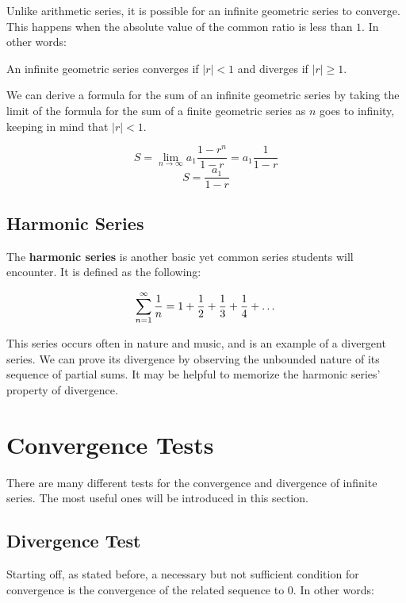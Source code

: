 \documentclass[11pt]{article}
\begin{document}
Unlike arithmetic series, it is possible for an infinite geometric series to converge. This happens when the absolute value of the common ratio is less than $1$. In other words: \\

\begin{center}
An infinite geometric series converges if $|r| < 1$ and diverges if $|r| \geq 1$.
\end{center}
\vspace{0.5 cm}

We can derive a formula for the sum of an infinite geometric series by taking the limit of the formula for the sum of a finite geometric series as $n$ goes to infinity, keeping in mind that $|r| < 1$.

\[ S = \lim_{n \to \infty} a_1 \frac{1-r^n}{1-r} = a_1 \frac{1}{1-r}\]
\[ S = \frac{a_1}{1-r} \]


\subsection{Harmonic Series}
The \textbf{harmonic series} is another basic yet common series students will encounter. It is defined as the following:

\[ \sum_{n=1}^{\infty} \frac{1}{n} = 1 + \frac{1}{2} + \frac{1}{3} + \frac{1}{4} + \text{\dots}\]

This series occurs often in nature and music, and is an example of a divergent series. We can prove its divergence by observing the unbounded nature of its sequence of partial sums. It may be helpful to memorize the harmonic series' property of divergence.

\section{Convergence Tests}
There are many different tests for the convergence and divergence of infinite series. The most useful ones will be introduced in this section.

\subsection{Divergence Test}
Starting off, as stated before, a necessary but not sufficient condition for convergence is the convergence of the related sequence to $0$. In other words:\\
\end{document}
